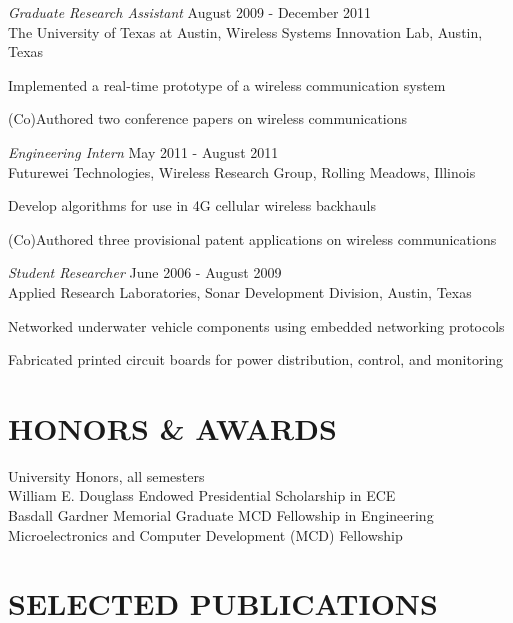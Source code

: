 \documentclass[line,margin=1in]{res}
\begin{document}
\begin{resume}
{\sl Graduate Research Assistant} \hfill August 2009 - December 2011 \\
The University of Texas at Austin, Wireless Systems Innovation Lab, Austin, Texas
\begin{compactitem}  
  \item Implemented a real-time prototype of a wireless communication system~\cite{massey2012implementation}
  \item (Co)Authored two conference papers on wireless communications~\cite{starr2011interference,massey2012implementation}
\end{compactitem}

{\sl Engineering Intern} \hfill May 2011 - August 2011 \\
Futurewei Technologies, Wireless Research Group, Rolling Meadows, Illinois
\begin{compactitem}  
  \item Develop algorithms for use in 4G cellular wireless backhauls
  \item (Co)Authored three provisional patent applications on wireless communications~\cite{truong2011designing,starr2011method,starr2011variable}
\end{compactitem}

{\sl Student Researcher} \hfill June 2006 - August 2009 \\
Applied Research Laboratories, Sonar Development Division, Austin, Texas
\begin{compactitem}
  \item Networked underwater vehicle components using embedded networking protocols
  \item Fabricated printed circuit boards for power distribution, control, and monitoring
\end{compactitem}

\section{HONORS \& AWARDS}
University Honors, all semesters \\
William E. Douglass Endowed Presidential Scholarship in ECE \\
Basdall Gardner Memorial Graduate MCD Fellowship in Engineering \\
Microelectronics and Computer Development (MCD) Fellowship

\section{SELECTED PUBLICATIONS}
\nocite{*}
\renewcommand{\refname}{}


\end{resume}
\end{document}
